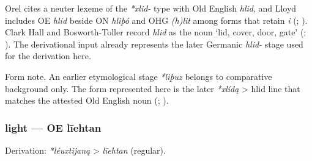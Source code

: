 \documentclass[
  british,
  a4paper,
]{article}
\begin{document}
Orel cites a neuter lexeme of the \emph{*xliđ-} type with Old English
\emph{hlid}, and Lloyd includes OE \emph{hlid} beside ON \emph{hliþó}
and OHG \emph{(h)lit} among forms that retain \emph{i}
(; ). Clark Hall and Bosworth-Toller record \emph{hlid} as the
noun `lid, cover, door, gate' (; ). The derivational input already represents the later Germanic
\emph{hliđ-} stage used for the derivation here.

Form note. An earlier etymological stage \emph{*liþuz} belongs to
comparative background only. The form represented here is the later
\emph{*xlídą} \textgreater{} hlid line that matches the attested Old
English noun (;
).

\subsubsection{light --- OE līehtan}\label{light-oe-lux12behtan}

Derivation: \emph{*léuxtijaną} \textgreater{} \emph{līehtan} (regular).

\begingroup
\setlength{\fboxsep}{6pt}
\end{document}
